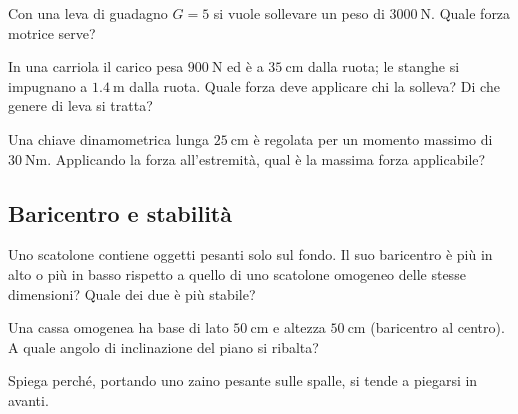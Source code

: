 \begin{esercizio}
Con una leva di guadagno $G = 5$ si vuole sollevare un peso di $\SI{3000}{\newton}$. Quale forza motrice serve?\\
\end{esercizio}

\begin{esercizio}
In una carriola il carico pesa $\SI{900}{\newton}$ ed è a $\SI{35}{\centi\meter}$ dalla ruota; le stanghe si impugnano a $\SI{1,4}{\meter}$ dalla ruota. Quale forza deve applicare chi la solleva? Di che genere di leva si tratta?\\
\end{esercizio}

\begin{esercizio}
Una chiave dinamometrica lunga $\SI{25}{\centi\meter}$ è regolata per un momento massimo di $\SI{30}{\newton\meter}$. Applicando la forza all'estremità, qual è la massima forza applicabile?\\
\end{esercizio}

\subsection*{Baricentro e stabilità}

\begin{esercizio}
Uno scatolone contiene oggetti pesanti solo sul fondo. Il suo baricentro è più in alto o più in basso rispetto a quello di uno scatolone omogeneo delle stesse dimensioni? Quale dei due è più stabile?\\
\end{esercizio}

\begin{esercizio}
Una cassa omogenea ha base di lato $\SI{50}{\centi\meter}$ e altezza $\SI{50}{\centi\meter}$ (baricentro al centro). A quale angolo di inclinazione del piano si ribalta?\\
\end{esercizio}

\begin{esercizio}
Spiega perché, portando uno zaino pesante sulle spalle, si tende a piegarsi in avanti.\\
\end{esercizio}


